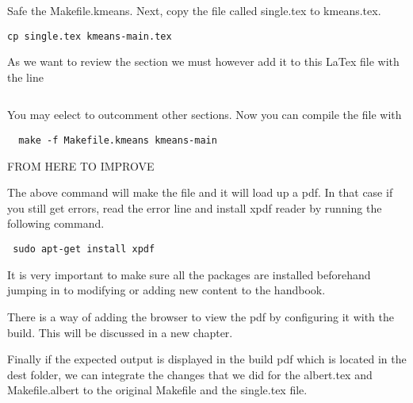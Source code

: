Safe the Makefile.kmeans.
Next, copy the file called single.tex to kmeans.tex. 

\begin{lstlisting}
cp single.tex kmeans-main.tex
\end{lstlisting}

As we want to review the section we must however  add it to this LaTex
file with the line

\begin{lstlisting}

\end{lstlisting}

You may eelect to outcomment other sections.
Now you can compile the file with 

\begin{lstlisting}
  make -f Makefile.kmeans kmeans-main
\end{lstlisting}

FROM HERE TO IMPROVE

The above command will make the file and it will load up a pdf.  In
that case if you still get errors, read the error line and install
xpdf reader by running the following command.

\begin{lstlisting}
 sudo apt-get install xpdf
\end{lstlisting}

It is very important to make sure all the packages are installed
beforehand jumping in to modifying or adding new content to the
handbook.

There is a way of adding the browser to view the pdf by configuring it
with the build. This will be discussed in a new chapter.

Finally if the expected output is displayed in the build pdf which is located in the dest folder, we can integrate the changes that we did for the albert.tex and Makefile.albert to the original Makefile and the single.tex file. 

